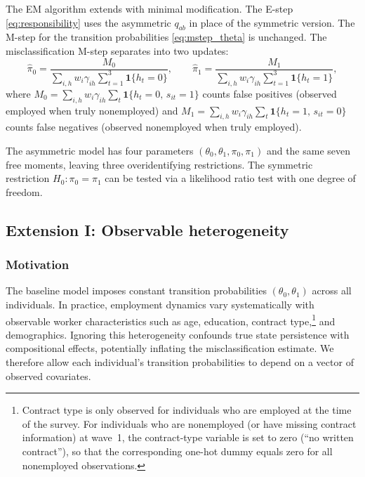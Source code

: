 The EM algorithm extends with minimal modification. The E-step
\eqref{eq:responsibility} uses the asymmetric \(q_{ab}\) in place of
the symmetric version. The M-step for the transition probabilities
\eqref{eq:mstep_theta} is unchanged. The misclassification M-step
separates into two updates:
\begin{equation}
\hat{\pi}_0 = \frac{M_0}{\sum_{i,h} w_i \gamma_{ih}
  \sum_{t=1}^{3} \mathbf{1}\{h_t = 0\}}, \qquad
\hat{\pi}_1 = \frac{M_1}{\sum_{i,h} w_i \gamma_{ih}
  \sum_{t=1}^{3} \mathbf{1}\{h_t = 1\}},
\label{eq:mstep_asymmetric}
\end{equation}
where
\(M_0 = \sum_{i,h} w_i \gamma_{ih}
\sum_{t} \mathbf{1}\{h_t = 0,\, s_{it} = 1\}\)
counts false positives (observed employed when truly nonemployed) and
\(M_1 = \sum_{i,h} w_i \gamma_{ih}
\sum_{t} \mathbf{1}\{h_t = 1,\, s_{it} = 0\}\)
counts false negatives (observed nonemployed when truly employed).

The asymmetric model has four parameters
\((\theta_0, \theta_1, \pi_0, \pi_1)\) and the same seven free moments,
leaving three overidentifying restrictions. The symmetric restriction
\(H_0: \pi_0 = \pi_1\) can be tested via a likelihood ratio test with
one degree of freedom.

\subsection{Extension I: Observable heterogeneity}
\label{sec:covariates}

\subsubsection{Motivation}

The baseline model imposes constant transition probabilities
\((\theta_0, \theta_1)\) across all individuals. In practice, employment
dynamics vary systematically with observable worker characteristics such as
age, education, contract type,\footnote{Contract type is only observed for
individuals who are employed at the time of the survey. For individuals who
are nonemployed (or have missing contract information) at wave~1, the
contract-type variable is set to zero (``no written contract''), so that
the corresponding one-hot dummy equals zero for all nonemployed
observations.} and demographics. Ignoring this heterogeneity
confounds true state persistence with compositional effects, potentially
inflating the misclassification estimate. We therefore allow each
individual's transition probabilities to depend on a vector of observed
covariates.


